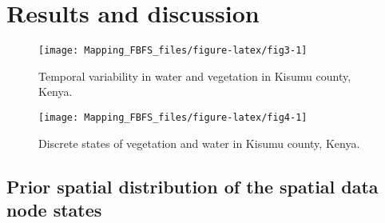 \documentclass[12pt,oneside]{article}
\begin{document}
\hypertarget{II}{%
\section{Results and discussion}\label{II}}

\begin{figure}[!htbp]

{\centering \texttt{[image: Mapping\_FBFS\_files/figure-latex/fig3-1]} 

}

\caption{Temporal variability in water and vegetation in Kisumu county, Kenya.}\label{fig:fig3}
\end{figure}

\begin{figure}[!htbp]

{\centering \texttt{[image: Mapping\_FBFS\_files/figure-latex/fig4-1]} 

}

\caption{Discrete states of vegetation and water in Kisumu county, Kenya.}\label{fig:fig4}
\end{figure}

\begin{table}[t]

\caption{\label{tab:table2}Spatial coverage of different states of vegetation and flood in Kisumu County, Kenya.}
\centering
{}
\end{table}

\hypertarget{II4}{%
\subsection{Prior spatial distribution of the spatial data node states}\label{II4}}
\end{document}
